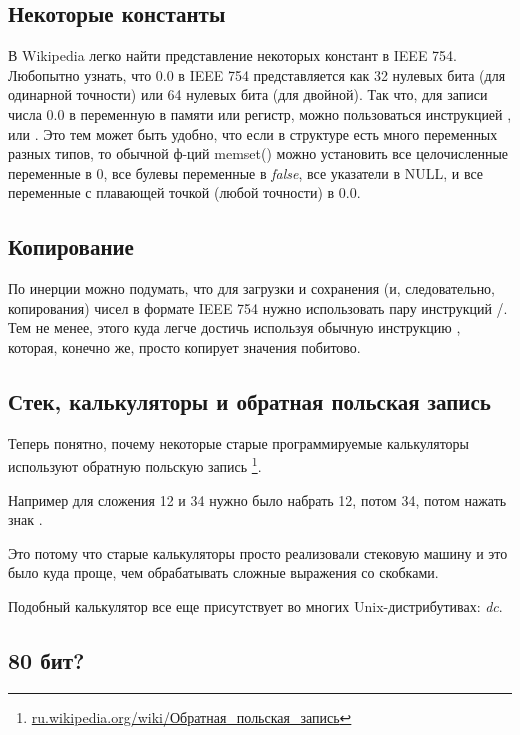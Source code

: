 \subsection{Некоторые константы}

В Wikipedia легко найти представление некоторых констант в IEEE 754.
Любопытно узнать, что 0.0 в IEEE 754 представляется как 32 нулевых бита (для одинарной точности) или 64 нулевых бита
(для двойной).
Так что, для записи числа 0.0 в переменную в памяти или регистр, можно пользоваться инструкцией \MOV, или .
Это тем может быть удобно, что если в структуре есть много переменных разных типов, то обычной ф-ций memset()
можно установить все целочисленные переменные в 0, все булевы переменные в \emph{false}, все указатели в NULL,
и все переменные с плавающей точкой (любой точности) в 0.0.

\subsection{Копирование}

По инерции можно подумать, что для загрузки и сохранения (и, следовательно, копирования) чисел в формате
IEEE 754 нужно использовать пару инструкций /.
Тем не менее, этого куда легче достичь используя обычную инструкцию ,
которая, конечно же, просто копирует значения побитово.

\subsection{Стек, калькуляторы и обратная польская запись}

Теперь понятно, почему некоторые старые программируемые калькуляторы используют обратную польскую запись
\footnote{\href{http://go.yurichev.com/17355}{ru.wikipedia.org/wiki/Обратная\_польская\_запись}}.

Например для сложения 12 и 34 нужно было набрать 12, потом 34, потом нажать знак .

Это потому что старые калькуляторы просто реализовали стековую машину и это было куда проще, чем обрабатывать сложные выражения со скобками.

Подобный калькулятор все еще присутствует во многих Unix-дистрибутивах: \emph{dc}.

\subsection{80 бит?}

